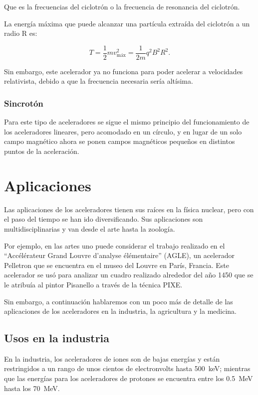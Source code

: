 \documentclass[12pt]{article}
\theoremstyle{break}
\theoremstyle{nonumberbreak}
\begin{document}
    Que es la frecuencias del ciclotrón o la frecuencia de resonancia del ciclotrón.

    La energía máxima que puede alcanzar una partícula extraída del ciclotrón a un radio R es:

    \begin{equation*}
      T = \dfrac{1}{2}mv^{2}_{\text{máx}} = \dfrac{1}{2m}q^{2}B^{2}R^{2}.
    \end{equation*}

    Sin embargo, este acelerador ya no funciona para poder acelerar a velocidades relativista, debido a que la frecuencia necesaria sería altísima.

    \subsubsection{Sincrotón}

    Para este tipo de aceleradores se sigue el mismo principio del funcionamiento de los aceleradores lineares, pero acomodado en un círculo, y en lugar de un solo campo magnético ahora se ponen campos magnéticos pequeños en distintos puntos de la aceleración.
    
    \section{Aplicaciones}
    
    Las aplicaciones de los aceleradores tienen sus raíces en la física nuclear, pero con el paso del tiempo se han ido diversificando. Sus aplicaciones son multidisciplinarias y van desde el arte hasta la zoología.\cite{amaldi2000importance}
    
    Por ejemplo, en las artes uno puede considerar el trabajo realizado en el ``Accélérateur Grand Louvre d'analyse élémentaire'' (AGLE), un acelerador Pelletron que se encuentra en el museo del Louvre en París, Francia. Este acelerador se usó para analizar un cuadro realizado alrededor del año 1450 que se le atribuía al pintor Pisanello a través de la técnica PIXE.

    Sin embargo, a continuación hablaremos con un poco más de detalle de las aplicaciones de los aceleradores en la industria, la agricultura y la medicina.
    
    \subsection{Usos en la industria}

    En la industria\cite{chernyaev2014particle}, los aceleradores de iones son de bajas energías y están restringidos a un rango de unos cientos de electronvolts hasta \qty{500}{\keV}; mientras que las energías para los aceleradores de protones se encuentra entre los \qty{0.5}{\MeV} hasta los \qty{70}{\MeV}. 
\end{document}
